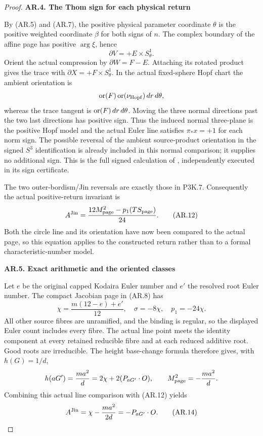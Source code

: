 \begin{proof}
\par

\medskip\noindent\textbf{AR.4. The Thom sign for each physical return}

By (AR.5) and (AR.7), the positive physical parameter coordinate
\(\theta\) is the positive weighted coordinate \(\beta\)
for both signs of \(n\). The complex boundary of the affine
page has positive \(\arg\xi\), hence
\[
                         \partial V=+E\times S^1_\theta.
\]
Orient the actual compression by \(\partial W=F-E\).
Attaching its rotated product gives the trace with
\(\partial X=+F\times S^1_\theta\). In the actual
fixed-sphere Hopf chart the ambient orientation is
\[
 {\rm or}(F)\,{\rm or}(\nu_{\rm Hopf})\,dr\,d\theta,
\]
whereas the trace tangent is \({\rm or}(F)\,dr\,d\theta\).
Moving the three normal directions past the two last directions
has positive sign. Thus the induced normal three-plane is the
positive Hopf model and the actual Euler line satisfies
\(\pi_*x=+1\) for each norm sign. The possible reversal of
the ambient source-product orientation in the signed \(S^3\)
identification is already included in this normal comparison;
it supplies no additional sign. This is the full signed
calculation of , independently
executed in its sign certificate.

The two outer-bordism/Jin reversals are exactly those in P3K.7.
Consequently the actual positive-return invariant is
\[
 A^{\rm Jin}=\frac{12M_{\rm page}^2-p_1(TS_{\rm page})}{24}.
                                                        \tag{AR.12}
\]
Both the circle line and its orientation have now been compared
to the actual page, so this equation applies to the constructed
return rather than to a formal characteristic-number model.

\par

\medskip\noindent\textbf{AR.5. Exact arithmetic and the oriented classes}

Let \(e\) be the original capped Kodaira Euler number and
\(e'\) the resolved root Euler number. The compact Jacobian
page in (AR.8) has
\[
 \chi=\frac{m(12-e)+e'}{12},\quad
 \sigma=-8\chi,\quad p_1=-24\chi.                    \tag{AR.13}
\]
All other source fibres are unramified, and the binding is
regular, so the displayed Euler count includes every fibre.
The actual line point meets the identity component at every
retained reducible fibre and at each reduced additive root.
Good roots are irreducible. The height base-change formula
therefore gives, with \(h(G)=1/d\),
\[
 h(aG')=\frac{ma^2}{d}=2\chi+2(P_{aG'}\cdot O),
 \qquad M_{\rm page}^2=-\frac{ma^2}{d}.
\]
Combining this actual line comparison with (AR.12) yields
\[
 A^{\rm Jin}=\chi-\frac{ma^2}{2d}=-P_{aG'}\cdot O.
                                                        \tag{AR.14}
\]


\end{proof}
